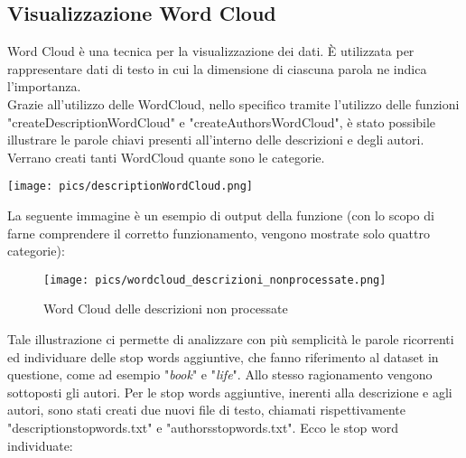 \documentclass[12pt,oneside]{article}
\begin{document}
    \hfill
    \hfill
    \begin{enumerate}
    \subsection{Visualizzazione Word Cloud}\label{word}
    \begin{justify}
    Word Cloud è una tecnica per la visualizzazione dei dati. È utilizzata per rappresentare dati di testo in cui la dimensione di ciascuna parola ne indica l'importanza.\\
    Grazie all'utilizzo delle WordCloud, nello specifico tramite l'utilizzo delle funzioni "createDescriptionWordCloud" e "createAuthorsWordCloud", è stato possibile illustrare le parole chiavi presenti all'interno delle descrizioni e degli autori. Verrano creati tanti WordCloud quante sono le categorie.
    \end{justify}
    \texttt{[image: pics/descriptionWordCloud.png]}
    
    \newpage
    \begin{justify}
    La seguente immagine è un esempio di output della funzione (con lo scopo di farne comprendere il corretto funzionamento, vengono mostrate solo quattro categorie):
    \end{justify}
    \begin{figure}[H]
    \centering
    \texttt{[image: pics/wordcloud\_descrizioni\_nonprocessate.png]}
    \caption{Word Cloud delle descrizioni non processate}
    \end{figure}

    \begin{justify}
    Tale illustrazione ci permette di analizzare con più semplicità le parole ricorrenti ed individuare delle stop words aggiuntive, che fanno riferimento al dataset in questione, come ad esempio "\textit{book}" e "\textit{life}". Allo stesso ragionamento vengono sottoposti gli autori. Per le stop words aggiuntive, inerenti alla descrizione e agli autori, sono stati creati due nuovi file di testo, chiamati rispettivamente "description\textunderscore{}stopwords.txt" e "authors\textunderscore{}stopwords.txt". Ecco le stop word individuate:
    \end{justify}
    

\end{enumerate}
\end{document}
